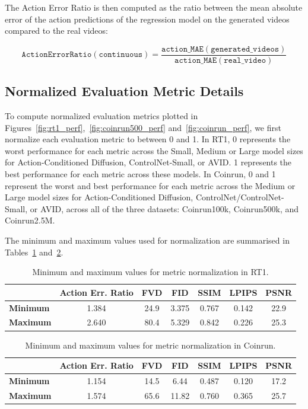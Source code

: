 The Action Error Ratio is then computed as the ratio between the mean absolute error of the action predictions of the regression model on the generated videos compared to the real videos:

$$
\mathtt{Action Error Ratio (continuous)} = \frac{\mathtt{action\_MAE(generated\_videos)}}{\mathtt{action\_MAE(real\_video)}}
$$

\subsection{Normalized Evaluation Metric Details}
\label{app:normalization}
To compute normalized evaluation metrics plotted in Figures~\ref{fig:rt1_perf},~\ref{fig:coinrun500_perf} and~\ref{fig:coinrun_perf}, we first normalize each evaluation metric to between 0 and 1. In RT1, 0 represents the worst performance for each metric across the Small, Medium or Large model sizes for Action-Conditioned Diffusion, 
ControlNet-Small, or AVID. 1 represents the best performance for each metric across these models.
%
In Coinrun, 0 and 1 represent the worst and best performance for each metric across the Medium or Large model sizes for Action-Conditioned Diffusion,  ControlNet/ControlNet-Small, or AVID, across all of the three datasets: Coinrun100k, Coinrun500k, and Coinrun2.5M. 

The minimum and maximum values used for normalization are summarised in Tables~\ref{tab:rt1_norm} and~\ref{tab:coinrun_norm}.


\begin{table}[h]
\small
\centering
\begin{tabular}{lcccccc}
\toprule
\textbf{} &  \textbf{Action Err. Ratio} &
  \textbf{{FVD }} &
  \textbf{{FID}} &
  \textbf{{SSIM}} &
  \textbf{{LPIPS}} &
  \textbf{{PSNR}}  \\
\midrule
\textbf{Minimum} & 1.384 & 24.9 & 3.375 & 0.767 & 0.142 & 22.9 \\
\textbf{Maximum} & 2.640 & 80.4 & 5.329 & 0.842 & 0.226 & 25.3 \\
\bottomrule
\end{tabular}
\caption{Minimum and maximum values for metric normalization in RT1. \label{tab:rt1_norm}}
\end{table}


\begin{table}[h]
\small
\centering
\begin{tabular}{lcccccc}
\toprule
\textbf{} &  \textbf{Action Err. Ratio} &
  \textbf{{FVD }} &
  \textbf{{FID}} &
  \textbf{{SSIM}} &
  \textbf{{LPIPS}} &
  \textbf{{PSNR}}  \\
\midrule
\textbf{Minimum} & 1.154 & 14.5 & 6.44 & 0.487 & 0.120 & 17.2 \\
\textbf{Maximum} & 1.574 & 65.6 & 11.82 & 0.760 & 0.365 & 25.7 \\
\bottomrule
\end{tabular}
\caption{Minimum and maximum values for metric normalization in Coinrun. \label{tab:coinrun_norm}}
\end{table}

